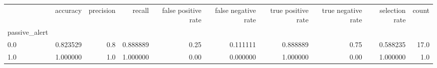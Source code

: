 \begin{tabular}{lrrrrrrrrr}
\toprule
{} &  accuracy &  precision &    recall &  false positive rate &  false negative rate &  true positive rate &  true negative rate &  selection rate &  count \\
passive\_alert &           &            &           &                      &                      &                     &                     &                 &        \\
\midrule
0.0           &  0.823529 &        0.8 &  0.888889 &                 0.25 &             0.111111 &            0.888889 &                0.75 &        0.588235 &   17.0 \\
1.0           &  1.000000 &        1.0 &  1.000000 &                 0.00 &             0.000000 &            1.000000 &                0.00 &        1.000000 &    1.0 \\
\bottomrule
\end{tabular}

